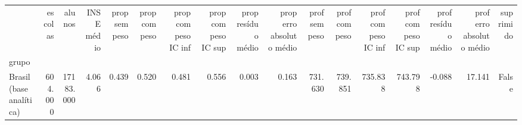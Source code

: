 \begin{tabular}{lrrrrrrrrrrrrrrrr}
\toprule
 & escolas & alunos & INSE médio & prop sem peso & prop com peso & prop com peso IC inf & prop com peso IC sup & prop resíduo médio & prop erro absoluto médio & prof sem peso & prof com peso & prof com peso IC inf & prof com peso IC sup & prof resíduo médio & prof erro absoluto médio & suprimido \\
grupo &  &  &  &  &  &  &  &  &  &  &  &  &  &  &  &  \\
\midrule
Brasil (base analítica) & 604.000 & 17183.000 & 4.066 & 0.439 & 0.520 & 0.481 & 0.556 & 0.003 & 0.163 & 731.630 & 739.851 & 735.838 & 743.798 & -0.088 & 17.141 & False \\
\bottomrule
\end{tabular}
